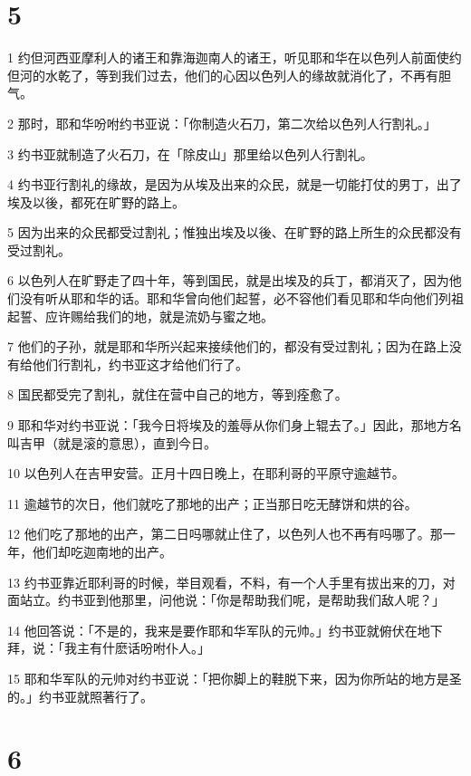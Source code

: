 \chapter{5}

\par 1 约但河西亚摩利人的诸王和靠海迦南人的诸王，听见耶和华在以色列人前面使约但河的水乾了，等到我们过去，他们的心因以色列人的缘故就消化了，不再有胆气。
\par 2 那时，耶和华吩咐约书亚说：「你制造火石刀，第二次给以色列人行割礼。」
\par 3 约书亚就制造了火石刀，在「除皮山」那里给以色列人行割礼。
\par 4 约书亚行割礼的缘故，是因为从埃及出来的众民，就是一切能打仗的男丁，出了埃及以後，都死在旷野的路上。
\par 5 因为出来的众民都受过割礼；惟独出埃及以後、在旷野的路上所生的众民都没有受过割礼。
\par 6 以色列人在旷野走了四十年，等到国民，就是出埃及的兵丁，都消灭了，因为他们没有听从耶和华的话。耶和华曾向他们起誓，必不容他们看见耶和华向他们列祖起誓、应许赐给我们的地，就是流奶与蜜之地。
\par 7 他们的子孙，就是耶和华所兴起来接续他们的，都没有受过割礼；因为在路上没有给他们行割礼，约书亚这才给他们行了。
\par 8 国民都受完了割礼，就住在营中自己的地方，等到痊愈了。
\par 9 耶和华对约书亚说：「我今日将埃及的羞辱从你们身上辊去了。」因此，那地方名叫吉甲（就是滚的意思），直到今日。
\par 10 以色列人在吉甲安营。正月十四日晚上，在耶利哥的平原守逾越节。
\par 11 逾越节的次日，他们就吃了那地的出产；正当那日吃无酵饼和烘的谷。
\par 12 他们吃了那地的出产，第二日吗哪就止住了，以色列人也不再有吗哪了。那一年，他们却吃迦南地的出产。
\par 13 约书亚靠近耶利哥的时候，举目观看，不料，有一个人手里有拔出来的刀，对面站立。约书亚到他那里，问他说：「你是帮助我们呢，是帮助我们敌人呢？」
\par 14 他回答说：「不是的，我来是要作耶和华军队的元帅。」约书亚就俯伏在地下拜，说：「我主有什麽话吩咐仆人。」
\par 15 耶和华军队的元帅对约书亚说：「把你脚上的鞋脱下来，因为你所站的地方是圣的。」约书亚就照著行了。

\chapter{6}

